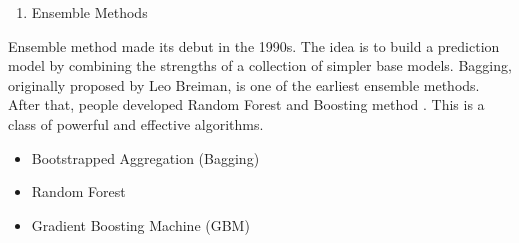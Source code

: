 \documentclass[12pt,]{krantz}
\providecommand{\tightlist}{%
  \setlength{\itemsep}{0pt}\setlength{\parskip}{0pt}}
\theoremstyle{definition}
\theoremstyle{definition}
\theoremstyle{remark}
\begin{document}
\begin{enumerate}
\def\labelenumi{\arabic{enumi}.}
\setcounter{enumi}{12}
\tightlist
\item
  Ensemble Methods
\end{enumerate}

Ensemble method made its debut in the 1990s. The idea is to build a
prediction model by combining the strengths of a collection of simpler
base models. Bagging, originally proposed by Leo Breiman, is one of the
earliest ensemble methods. After that, people developed Random Forest
\citep{Ho1998, amit1997} and Boosting method
\citep{Valiant1984, KV1989}. This is a class of powerful and effective
algorithms.

\begin{itemize}
\tightlist
\item
  Bootstrapped Aggregation (Bagging)
\item
  Random Forest
\item
  Gradient Boosting Machine (GBM)
\end{itemize}
\end{document}

